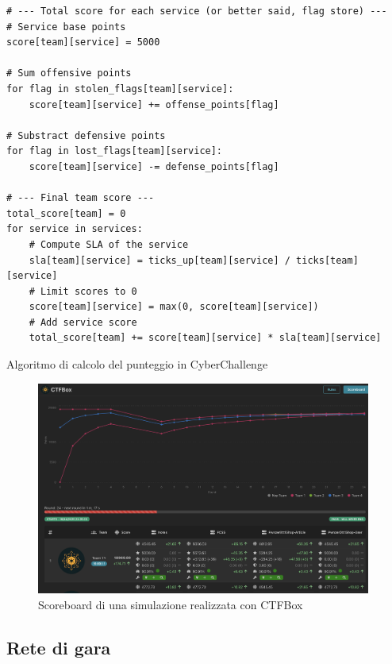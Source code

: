 \begin{listing}[H] 
\begin{verbatim}
# --- Total score for each service (or better said, flag store) ---
# Service base points 
score[team][service] = 5000 
            
# Sum offensive points 
for flag in stolen_flags[team][service]:
    score[team][service] += offense_points[flag] 
    
# Substract defensive points 
for flag in lost_flags[team][service]: 
    score[team][service] -= defense_points[flag]

# --- Final team score ---
total_score[team] = 0   
for service in services: 
    # Compute SLA of the service
    sla[team][service] = ticks_up[team][service] / ticks[team][service] 
    # Limit scores to 0
    score[team][service] = max(0, score[team][service]) 
    # Add service score
    total_score[team] += score[team][service] * sla[team][service]
\end{verbatim}
\vspace{-1em}
\caption{Algoritmo di calcolo del punteggio in CyberChallenge}\label{lst:scorecalc}
\end{listing}

\begin{figure}[H]
    \centering
    \includegraphics[width=0.98\textwidth]{images/chapter1/ctfbox_scoreboard.png}
    \caption{Scoreboard di una simulazione realizzata con CTFBox}\label{fig:ctfbox_scoreboard}
\end{figure}

\subsection{Rete di gara}

